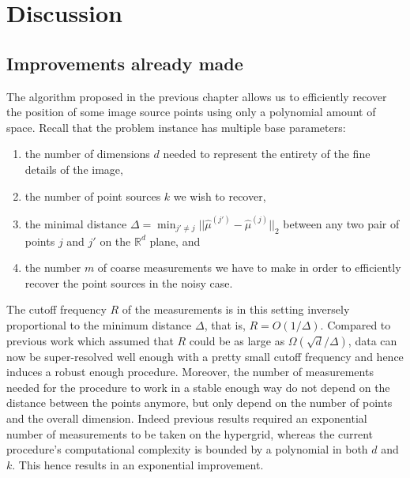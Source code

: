 \chapter{Discussion}
\section{Improvements already made}
The algorithm proposed in the previous chapter allows us to efficiently recover the position of some image source points using only a polynomial amount of space. Recall that the problem instance has multiple base parameters:
\begin{enumerate}
    \item the number of dimensions $d$ needed to represent the entirety of the fine details of the image,
    \item the number of point sources $k$ we wish to recover,
    \item the minimal distance $\Delta=\min_{j'\neq j}||\widehat{\mu}^{(j')}-\widehat{\mu}^{(j)}||_2$ between any two pair of points $j$ and $j'$ on the $\mathbb{R}^d$ plane, and
    \item the number $m$ of coarse measurements we have to make in order to efficiently recover the point sources in the noisy case.
\end{enumerate}
The cutoff frequency $R$ of the measurements is in this setting inversely proportional to the minimum distance $\Delta$, that is, $R=O(1/\Delta)$. Compared to previous work which assumed that $R$ could be as large as $\Omega(\sqrt{d}/\Delta)$, data can now be super-resolved well enough with a pretty small cutoff frequency and hence induces a robust enough procedure. Moreover, the number of measurements needed for the procedure to work in a stable enough way do not depend on the distance between the points anymore, but only depend on the number of points and the overall dimension. Indeed previous results required an exponential number of measurements to be taken on the hypergrid, whereas the current procedure's computational complexity is bounded by a polynomial in both $d$ and $k$. This hence results in an exponential improvement.

